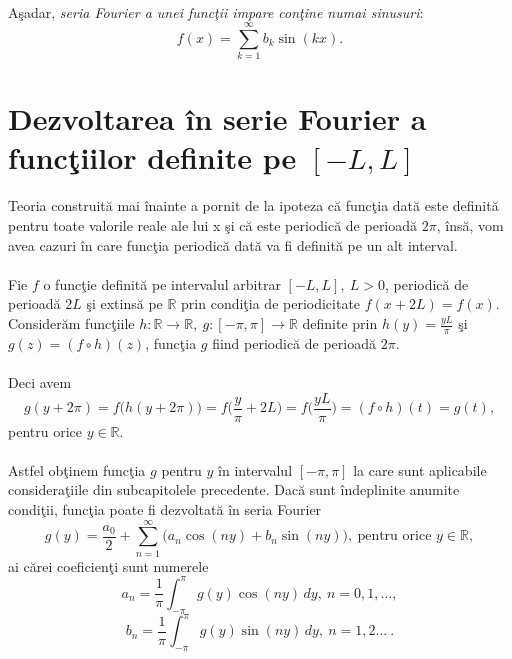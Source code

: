 \documentclass[a4paper,openany,12pt]{report}
\begin{document}
\paragraph*{}A\c sadar, \textit{seria Fourier a unei func\c tii impare con\c tine numai sinusuri}:
\begin{equation*}
f(x)=\sum_{k=1}^\infty b_k \sin(kx).
\end{equation*}



\section{Dezvoltarea \^ in serie Fourier a func\c tiilor definite pe $[-L, L]$}
\paragraph*{} Teoria construit\u a mai \^ inainte a pornit de la ipoteza c\u a func\c tia dat\u a este definit\u a pentru toate valorile reale ale lui x \c si c\u a este periodic\u a de perioad\u a $2\pi$, \^ ins\u a, vom avea cazuri \^ in care func\c tia periodic\u a dat\u a va fi definit\u a pe un alt interval.
\paragraph*{}Fie $f$ o func\c tie definit\u a pe intervalul arbitrar $[-L,L],\: L>0$, periodic\u a de perioad\u a $2L$ \c si extins\u a pe $\mathbb{R}$ prin condi\c tia de periodicitate $f(x+2L)=f(x)$. Consider\u am func\c tiile $h:\mathbb{R}\rightarrow\mathbb{R},\: g:[-\pi, \pi]\rightarrow\mathbb{R}$ definite prin $h(y)=\frac{yL}{\pi}$ \c si $g(z)=(f\circ h)(z)$, func\c tia $g$ fiind periodic\u a de perioad\u a $2\pi$.
\paragraph*{} Deci avem
\begin{equation*}
g(y+2\pi)=f\big(h(y+2\pi)\big)=f\Big(\frac{y}{\pi}+2L\Big)=f\Big(\frac{yL}{\pi}\Big)=(f\circ h)(t)=g(t), 
\end{equation*}
pentru orice $y\in \mathbb{R}$.
\paragraph*{}Astfel ob\c tinem func\c tia $g$ pentru $y$ \^ in intervalul $[-\pi, \pi]$ la care sunt aplicabile considera\c tiile din subcapitolele precedente. Dac\u a sunt \^ indeplinite anumite condi\c tii, func\c tia poate fi dezvoltat\u a \^ in seria Fourier
\begin{equation*}
g(y)=\frac{a_0}{2}+\sum_{n=1}^\infty\big(a_n\cos(ny)+b_n\sin(ny)\big),\:\text{pentru orice } y\in \mathbb{R},
\end{equation*}
ai c\u arei coeficien\c ti sunt numerele
\begin{equation*}
a_n=\frac{1}{\pi} \int_{-\pi}^{\pi}g(y) \cos(ny)\, dy,\: n=0, 1, ..., 
\end{equation*}
\begin{equation*}
b_n=\frac{1}{\pi} \int_{-\pi}^{\pi}g(y) \sin(ny)\, dy,\: n=1, 2 ...\:.
\end{equation*}
\end{document}
